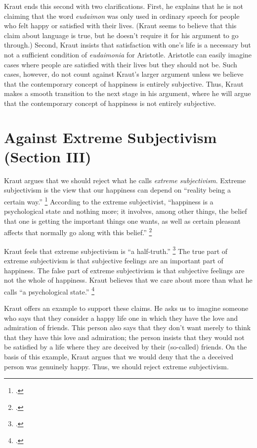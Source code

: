 \documentclass[12pt,letterpaper]{article}
\begin{document}
Kraut ends this second with two clarifications.
First, he explains that he is not claiming that the word \textit{eudaimon} was only used in ordinary speech for people who felt happy or satisfied with their lives.
(Kraut seems to believe that this claim about language is true, but he doesn't require it for his argument to go through.)
Second, Kraut insists that satisfaction with one's life is a necessary but not a sufficient condition of \textit{eudaimonia} for Aristotle.
Aristotle can easily imagine cases where people are satisfied with their lives but they should not be.
Such cases, however, do not count against Kraut's larger argument unless we believe that the contemporary concept of happiness is entirely subjective.
Thus, Kraut makes a smooth transition to the next stage in his argument, where he will argue that the contemporary concept of happiness is not entirely subjective.

\section*{Against Extreme Subjectivism (Section III)}

Kraut argues that we should reject what he calls \textit{extreme subjectivism}.
Extreme subjectivism is the view that our happiness can depend on ``reality being a certain way.''%
\footcite[][178, note 21]{two-conceptions-of-happiness-kraut-1979}
According to the extreme subjectivist, ``happiness is a psychological state and nothing more; it involves, among other things, the belief that one is getting the important things one wants, as well as certain pleasant affects that normally go along with this belief.''%
\footcite[][178]{two-conceptions-of-happiness-kraut-1979}

Kraut feels that extreme subjectivism is ``a half-truth.''%
\footcite[][178]{two-conceptions-of-happiness-kraut-1979}
The true part of extreme subjectivism is that subjective feelings are an important part of happiness.
The false part of extreme subjectivism is that subjective feelings are not the whole of happiness.
Kraut believes that we care about more than what he calls ``a psychological state.''%
\footcite[][179]{two-conceptions-of-happiness-kraut-1979}

Kraut offers an example to support these claims.
He asks us to imagine someone who says that they consider a happy life one in which they have the love and admiration of friends.
This person also says that they don't want merely to think that they have this love and admiration; the person insists that they would not be satisfied by a life where they are deceived by their (so-called) friends.
On the basis of this example, Kraut argues that we would deny that the a deceived person was genuinely happy.
Thus, we should reject extreme subjectivism.
\end{document}
